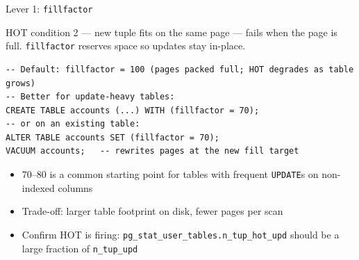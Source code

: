 \documentclass[aspectratio=169,10pt]{beamer}
\begin{document}
\begin{frame}[fragile]{Lever 1: \texttt{fillfactor}}

  HOT condition 2 --- new tuple fits on the same page --- fails when the page
  is full. \texttt{fillfactor} reserves space so updates stay in-place.

  \vspace{0.6em}
\begin{lstlisting}[style=ascii]
-- Default: fillfactor = 100 (pages packed full; HOT degrades as table grows)
-- Better for update-heavy tables:
CREATE TABLE accounts (...) WITH (fillfactor = 70);
-- or on an existing table:
ALTER TABLE accounts SET (fillfactor = 70);
VACUUM accounts;   -- rewrites pages at the new fill target
\end{lstlisting}

  \vspace{0.6em}
  \begin{itemize}
    \item 70--80 is a common starting point for tables with frequent \texttt{UPDATE}s
          on non-indexed columns
    \item Trade-off: larger table footprint on disk, fewer pages per scan
    \item Confirm HOT is firing: \texttt{pg\_stat\_user\_tables.n\_tup\_hot\_upd}
          should be a large fraction of \texttt{n\_tup\_upd}
  \end{itemize}

\end{frame}
\end{document}

